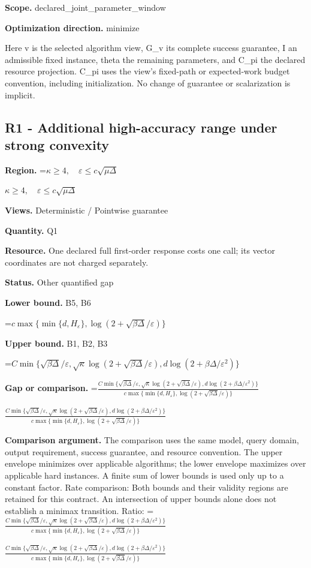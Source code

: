 \documentclass[10pt,a4paper]{article}
\newcommand{\AtlasMath}[1]{\par\begingroup\centering\setbox0=\hbox{$\displaystyle #1$}\ifdim\wd0>1.4\linewidth\typeout{ATLAS WIDE FORMULA: \the\wd0}\fi\ifdim\wd0>\linewidth\resizebox{\linewidth}{!}{\box0}\else\box0\fi\par\endgroup}
\newcommand{\AtlasInlineMath}[1]{\begingroup\setbox0=\hbox{$#1$}\ifdim\wd0>.4\linewidth\endgroup\AtlasMath{#1}\else\endgroup$#1$\fi}
\begin{document}
\textbf{Scope.} declared\_joint\_parameter\_window

\textbf{Optimization direction.} minimize

Here v is the selected algorithm view, G\_v its complete success guarantee, I an admissible fixed instance, theta the remaining parameters, and C\_pi the declared resource projection. C\_pi uses the view's fixed-path or expected-work budget convention, including initialization. No change of guarantee or scalarization is implicit.

\subsection{R1 - Additional high-accuracy range under strong convexity}
\textbf{Region.} \AtlasInlineMath{\kappa\ge4,\quad\varepsilon\le c\sqrt{\mu\Delta}}

\textbf{Views.} Deterministic / Pointwise guarantee

\textbf{Quantity.} Q1

\textbf{Resource.} One declared full first-order response costs one call; its vector coordinates are not charged separately.

\textbf{Status.} Other quantified gap

\textbf{Lower bound.} B5, B6

\AtlasMath{c\max\{\min\{d,H_\varepsilon\},\log(2+\sqrt{\beta\Delta}/\varepsilon)\}}
\textbf{Upper bound.} B1, B2, B3

\AtlasMath{C\min\{\sqrt{\beta\Delta}/\varepsilon,\sqrt\kappa\log(2+\sqrt{\beta\Delta}/\varepsilon),d\log(2+\beta\Delta/\varepsilon^2)\}}
\textbf{Gap or comparison.} \AtlasInlineMath{\frac{C\min\{\sqrt{\beta\Delta}/\varepsilon,\sqrt\kappa\log(2+\sqrt{\beta\Delta}/\varepsilon),d\log(2+\beta\Delta/\varepsilon^2)\}}{c\max\{\min\{d,H_\varepsilon\},\log(2+\sqrt{\beta\Delta}/\varepsilon)\}}}

\textbf{Comparison argument.} The comparison uses the same model, query domain, output requirement, success guarantee, and resource convention. The upper envelope minimizes over applicable algorithms; the lower envelope maximizes over applicable hard instances. A finite sum of lower bounds is used only up to a constant factor. Rate comparison: Both bounds and their validity regions are retained for this contract. An intersection of upper bounds alone does not establish a minimax transition. Ratio: \AtlasInlineMath{\frac{C\min\{\sqrt{\beta\Delta}/\varepsilon,\sqrt\kappa\log(2+\sqrt{\beta\Delta}/\varepsilon),d\log(2+\beta\Delta/\varepsilon^2)\}}{c\max\{\min\{d,H_\varepsilon\},\log(2+\sqrt{\beta\Delta}/\varepsilon)\}}}
\end{document}
